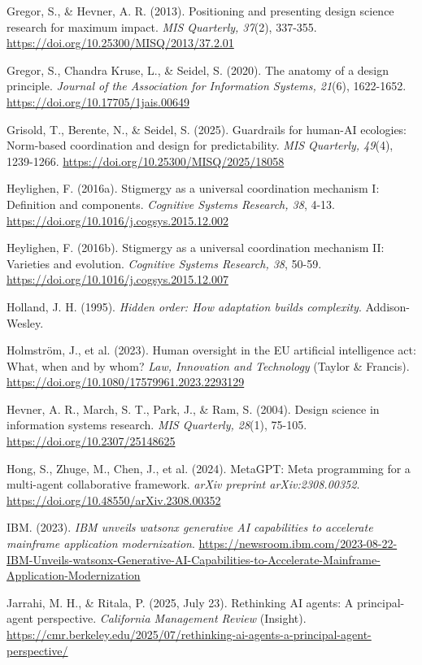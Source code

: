 \documentclass[12pt,a4paper]{article}
\begin{document}
Gregor, S., \& Hevner, A. R. (2013). Positioning and presenting design
science research for maximum impact. \emph{MIS Quarterly, 37}(2),
337-355. \url{https://doi.org/10.25300/MISQ/2013/37.2.01}

Gregor, S., Chandra Kruse, L., \& Seidel, S. (2020). The anatomy of a
design principle. \emph{Journal of the Association for Information
Systems, 21}(6), 1622-1652.
\url{https://doi.org/10.17705/1jais.00649}

Grisold, T., Berente, N., \& Seidel, S. (2025). Guardrails for human-AI
ecologies: Norm-based coordination and design for predictability.
\emph{MIS Quarterly, 49}(4), 1239-1266.
\url{https://doi.org/10.25300/MISQ/2025/18058}

Heylighen, F. (2016a). Stigmergy as a universal coordination mechanism
I: Definition and components. \emph{Cognitive Systems Research, 38},
4-13. \url{https://doi.org/10.1016/j.cogsys.2015.12.002}

Heylighen, F. (2016b). Stigmergy as a universal coordination mechanism
II: Varieties and evolution. \emph{Cognitive Systems Research, 38},
50-59. \url{https://doi.org/10.1016/j.cogsys.2015.12.007}

Holland, J. H. (1995). \emph{Hidden order: How adaptation builds
complexity}. Addison-Wesley.

Holmström, J., et al. (2023). \textquotesingle Human
oversight\textquotesingle{} in the EU artificial intelligence act: What,
when and by whom? \emph{Law, Innovation and Technology} (Taylor \&
Francis). \url{https://doi.org/10.1080/17579961.2023.2293129}

Hevner, A. R., March, S. T., Park, J., \& Ram, S. (2004). Design
science in information systems research. \emph{MIS Quarterly, 28}(1),
75-105. \url{https://doi.org/10.2307/25148625}

Hong, S., Zhuge, M., Chen, J., et al. (2024). MetaGPT: Meta programming
for a multi-agent collaborative framework. \emph{arXiv preprint
arXiv:2308.00352}. \url{https://doi.org/10.48550/arXiv.2308.00352}

IBM. (2023). \emph{IBM unveils watsonx generative AI capabilities to
accelerate mainframe application modernization}.
\url{https://newsroom.ibm.com/2023-08-22-IBM-Unveils-watsonx-Generative-AI-Capabilities-to-Accelerate-Mainframe-Application-Modernization}

Jarrahi, M. H., \& Ritala, P. (2025, July 23). Rethinking AI agents: A
principal-agent perspective. \emph{California Management Review}
(Insight).
\url{https://cmr.berkeley.edu/2025/07/rethinking-ai-agents-a-principal-agent-perspective/}
\end{document}

